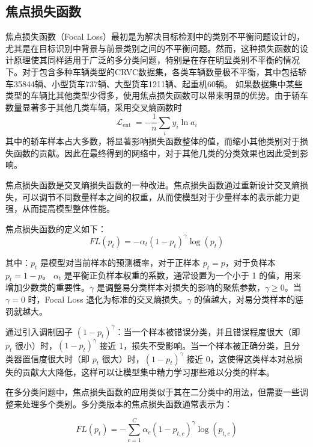 \subsection{焦点损失函数}
焦点损失函数（Focal Loss）最初是为解决目标检测中的类别不平衡问题设计的，尤其是在目标识别中背景与前景类别之间的不平衡问题。然而，这种损失函数的设计原理使其同样适用于广泛的多分类问题，特别是在存在明显类别不平衡的情况下。对于包含多种车辆类型的CRVC数据集，各类车辆数量极不平衡，其中包括轿车35844辆、小型货车737辆、大型货车1211辆、起重机60辆。 如果数据集中某些类型的车辆比其他类型少得多，使用焦点损失函数可以带来明显的优势。由于轿车数量显著多于其他几类车辆，采用交叉熵函数时
\begin{equation}
    \mathcal{L}_{\text {ent }}=-\frac{1}{n} \sum_{i} y_{i} \ln a_{i}
\end{equation}
其中的轿车样本占大多数，将显著影响损失函数整体的值，而缩小其他类别对于损失函数的贡献。因此在最终得到的网络中，对于其他几类的分类效果也因此受到影响。


焦点损失函数是交叉熵损失函数的一种改进。焦点损失函数通过重新设计交叉熵损失，可以调节不同数量样本之间的权重，从而使模型对于少量样本的表示能力更强，从而提高模型整体性能。


焦点损失函数的定义如下：
\begin{equation}
    FL(p_t) = -\alpha_t (1 - p_t)^\gamma \log(p_t)
\end{equation}

其中：\( p_t \) 是模型对当前样本的预测概率，对于正样本 \( p_t = p \)，对于负样本 \( p_t = 1 - p \)。 \( \alpha_t \) 是平衡正负样本权重的系数，通常设置为一个小于 1 的值，用来增加少数类的重要性。\( \gamma \) 是调整易分类样本对损失的影响的聚焦参数，\( \gamma \geq 0 \)。当 \( \gamma = 0 \) 时，Focal Loss 退化为标准的交叉熵损失。\( \gamma \) 的值越大，对易分类样本的惩罚就越大。


通过引入调制因子 \( (1 - p_t)^\gamma \)：当一个样本被错误分类，并且错误程度很大（即 \( p_t \) 很小）时，\( (1 - p_t)^\gamma \) 接近 1，损失不受影响。当一个样本被正确分类，且分类器置信度很大时（即 \( p_t \) 很大）时，\( (1 - p_t)^\gamma \) 接近 0，这使得这类样本对总损失的贡献大大降低，这样可以让模型集中精力学习那些难以分类的样本。


在多分类问题中，焦点损失函数的应用类似于其在二分类中的用法，但需要一些调整来处理多个类别。多分类版本的焦点损失函数通常表示为：

\begin{equation}
    FL(p_t) = - \sum_{c=1}^C \alpha_c (1 - p_{t,c})^\gamma \log(p_{t,c})
\end{equation}


